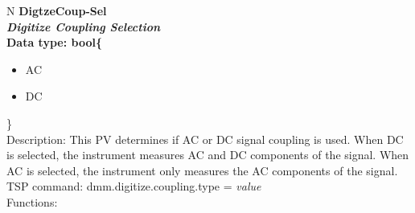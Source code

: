 \documentclass[openany]{article}
\begin{document}
		\begin{tabular}{N}
			\hline
			\bfseries DigtzeCoup-Sel\label{pv:digtzecoup-sel} \\ \hline
			\emph{Digitize Coupling Selection} \\
			Data type: bool\{\begin{itemize}[noitemsep]
				\small
				\item[] AC
				\item[] DC
			\end{itemize}\} \\
			Description: This PV determines if AC or DC signal coupling is used. When DC is selected, the instrument measures AC and DC components of the signal. When AC is selected, the instrument only measures the AC components of the signal. \\
			TSP command: dmm.digitize.coupling.type = \emph{value} \\
			Functions: \\
			\arrayrulecolor{\FuncTableBorderColor}

		\end{tabular}
\end{document}
